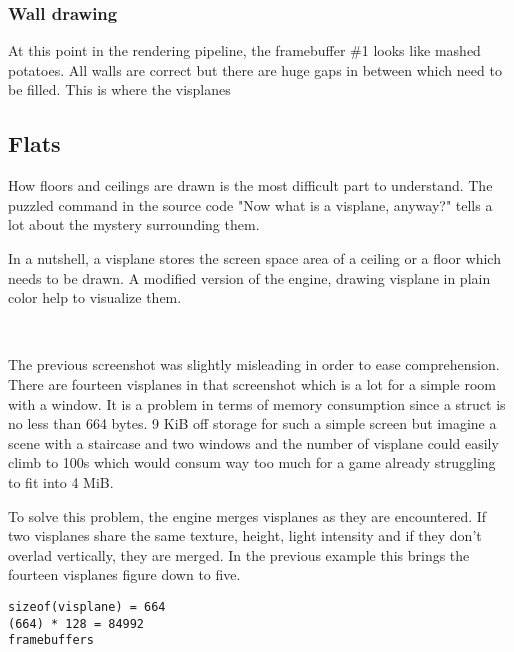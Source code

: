 \subsubsection{Wall drawing}
At this point in the rendering pipeline, the framebuffer \#1 looks like mashed potatoes. All walls are correct but there are huge gaps in between which need to be filled. This is where the visplanes\\
\par
{}

















\subsection{Flats}
How floors and ceilings are drawn is the most difficult part to understand. The puzzled command in the source code "Now what is a visplane, anyway?" tells a lot about the mystery surrounding them.\\
\par
{}
\par
In a nutshell, a visplane stores the screen space area of a ceiling or a floor which needs to be drawn. A modified version of the engine, drawing visplane in plain color help to visualize them.\\
\par
{}\\
\par
The previous screenshot was slightly misleading in order to ease comprehension. There are fourteen visplanes in that screenshot which is a lot for a simple room with a window. It is a problem in terms of memory consumption since a  struct is no less than 664 bytes. 9 KiB off storage for such a simple screen but imagine a scene with a staircase and two windows and the number of visplane could easily climb to 100s which would consum way too much for a game already struggling to fit into 4 MiB.\\
\par
To solve this problem, the engine merges visplanes as they are encountered. If two visplanes share the same texture, height, light intensity and if they don't overlad vertically, they are merged. In the previous example this brings the fourteen visplanes figure down to five.\\
\par
{}
\par
\begin{verbatim}
sizeof(visplane) = 664
(664) * 128 = 84992
framebuffers
\end{verbatim}








